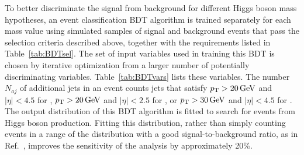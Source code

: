 \documentclass[11pt,twoside,a4paper,cmspaper,final,collab]{cms-tdr}
\begin{document}
To better discriminate the signal from background for
different Higgs boson mass hypotheses, an event classification BDT algorithm is trained separately for
each mass value using simulated samples of signal and background events
that pass the  selection criteria described above, together with the requirements listed in Table~\ref{tab:BDTsel}.
The set of input
variables used in training this BDT is chosen by iterative optimization from a larger number of
potentially discriminating variables. Table~\ref{tab:BDTvars}
lists these variables. The number $N_{aj}$ of additional jets in an
event counts jets that satisfy
$p_{\mathrm{T}}>20\,\text{Ge\hspace{-.08em}V}$ and $\left | \eta \right | < 4.5$
for \WlnH,   $p_{\mathrm{T}}>20\,\text{Ge\hspace{-.08em}V}$ and $\left | \eta \right | < 2.5$
for \ZllH, or  $p_{\mathrm{T}}>30\,\text{Ge\hspace{-.08em}V}$ and $\left | \eta \right | < 4.5$
for \ZnnH.
The output distribution of this BDT algorithm is fitted to search for
events from Higgs boson production. Fitting this distribution,
rather than simply counting events in a range of the distribution with
a good signal-to-background ratio, as in Ref.~\cite{VHbb_PLB}, improves the sensitivity
of the analysis by approximately 20\%.
\end{document}
